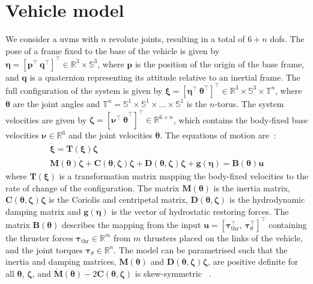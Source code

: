 \documentclass[../main.tex]{subfiles}
\begin{document}
\section{Vehicle model}\label{sec:model}\vspace{-7pt}
We consider a \gls{uvms} with $n$ revolute joints, resulting in a total of $6+n$ \glspl{dof}. The pose of a frame fixed to the base of the vehicle is given by $\bm{\eta} = [\bm{p}^\top\ \bm{q}^\top]^\top \in \mathbb{R}^3 \times \mathbb{S}^3$, where $\bm{p}$ is the position of the origin of the base frame, and $\bm{q}$ is a quaternion representing its attitude relative to an inertial frame. The full configuration of the system is given by $\bm{\xi} = [\bm{\eta}^\top \ \bm{\theta}^{\top} ]^{\top} \in \mathbb{R}^3 \times \mathbb{S}^3 \times \mathbb{T}^n$, where $\bm{\theta}$ are the joint angles and $\mathbb{T}^n = \mathbb{S}^1 \times \mathbb{S}^1 \times ... \times \mathbb{S}^1$ is the $n$-torus. The system velocities are given by $\bm{\zeta} = [\bm{\nu}^\top\ \dot{\bm{\theta}}^\top]^\top \in \mathbb{R}^{6+n}$, which contains the body-fixed base velocities $\bm{\nu} \in \mathbb{R}^6$ and the joint velocities $\dot{\bm{\theta}}$.
The equations of motion are~\citep{From2014,SchmidtDidlaukies2018}:
\begin{subequations}\label{eq:vms}
	\begin{gather}
		\dot{\bm{\xi}} = \bm{T}(\bm{\xi})\bm{\zeta}\\
		\bm{M}(\bm{\theta}) \dot{\bm{\zeta}} +\! \bm{C}(\bm{\theta},\bm{\zeta})\bm{\zeta} + \bm{D}(\bm{\theta},\bm{\zeta})\bm{\zeta} + \bm{g}(\bm{\eta}) = \bm{B}(\bm{\theta})\bm{u} \label{eq:vms_dyn}
	\end{gather}
\end{subequations}
where $\bm{T}(\bm{\xi})$ is a transformation matrix mapping the body-fixed velocities to the rate of change of the configuration. The matrix $\bm{M}(\bm{\theta})$ is the inertia matrix, $\bm{C}(\bm{\theta},\bm{\zeta})\bm{\zeta}$ is the Coriolis and centripetal matrix, $\bm{D}(\bm{\theta},\bm{\zeta})$ is the hydrodynamic damping matrix and $\bm{g}(\bm{\eta})$ is the vector of hydrostatic restoring forces. The matrix $\bm{B}(\bm{\theta})$ describes the mapping from the input $\bm{u} = \left[ \bm{\tau}_{\textrm{thr}}^\top,\   \bm{\tau}_{\theta}^\top \right]^\top$ containing the thruster forces $\bm{\tau}_{\textrm{thr}} \in \mathbb{R}^m$ from $m$ thrusters placed on the links of the vehicle, and the joint torques $\bm{\tau}_{\theta} \in \mathbb{R}^n$. The model can be parametrised such that the inertia and damping matrices, $\bm{M}(\bm{\theta})$ and $\bm{D}(\bm{\theta},\bm{\zeta})\bm{\zeta}$, are positive definite for all $\bm{\theta}$, $\bm{\zeta}$, and $\dot{\bm{M}}(\bm{\theta})-2 \bm{C}(\bm{\theta},\bm{\zeta})$ is skew-symmetric ~\citep{Antonelli2018}. 
\end{document}
